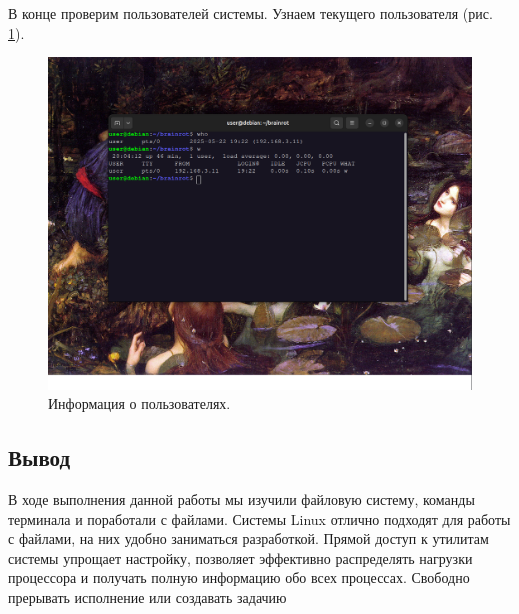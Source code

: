   В конце проверим пользователей системы. Узнаем текущего пользователя (рис. \ref{fig:who}). 

  \begin{figure}[h!]
      \centering
      \includegraphics[width=0.7\linewidth]{Pic/lab5/Снимок экрана от 2025-05-22 20-04-19.png}
      \caption{Информация о пользователях.}
      \label{fig:who}
  \end{figure}

  \subsection{Вывод}

  В ходе выполнения данной работы мы изучили файловую систему, команды терминала и поработали с файлами. Системы Linux отлично подходят для работы с файлами, на них удобно заниматься разработкой. Прямой доступ к утилитам системы упрощает настройку, позволяет эффективно распределять нагрузки процессора и получать полную информацию обо всех процессах. Свободно прерывать исполнение или создавать задачию